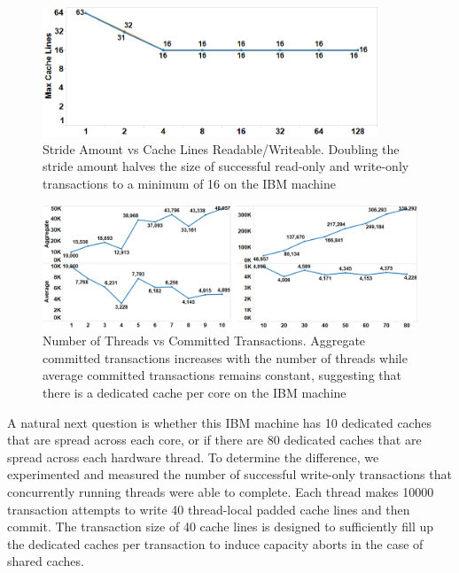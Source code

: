 \begin{figure}[]%
\centering
\includegraphics[width=100mm]{images/wttm_stride_readwrite_ibm}
\caption{Stride Amount vs Cache Lines Readable/Writeable. 
Doubling the stride amount halves the size of successful read-only and
write-only transactions to a minimum of 16 on the IBM machine}
\label{fig:wttm_stride_readwrite_ibm}
\end{figure}

\begin{figure}[]%
\centering
\includegraphics[width=\linewidth]{images/wttm_core_or_thread_ibm}
\caption{Number of Threads vs Committed Transactions. 
Aggregate committed transactions increases with the number of threads
while average committed transactions remains constant, suggesting that there is
a dedicated cache per core on the IBM machine}
\label{fig:wttm_core_or_thread_ibm}
\end{figure}

A natural next question is whether this IBM machine has 10 dedicated caches that
are spread across each core, or if there are 80 dedicated caches that are spread
across each hardware thread. To determine the difference, we experimented and
measured the number of successful write-only transactions that concurrently
running threads were able to complete. Each thread makes 10000 transaction
attempts to write 40 thread-local padded cache lines and then commit. The
transaction size of 40 cache lines is designed to sufficiently fill up the
dedicated caches per transaction to induce capacity aborts in the case of shared
caches.

